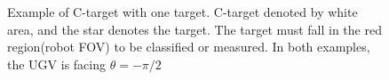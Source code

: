 \documentclass[12pt,draftcls,onecolumn]{IEEEtran}
\begin{document}
\begin{figure}[htp]
  \centering
  \quad
  \caption{Example of C-target with one target. C-target denoted by white area, and the star denotes the target. The target must fall in the red region(robot FOV) to be classified or measured. In both examples, the UGV is facing $\theta = -\pi/2$}
  \label{fig:4}
\end{figure}


\end{document}
